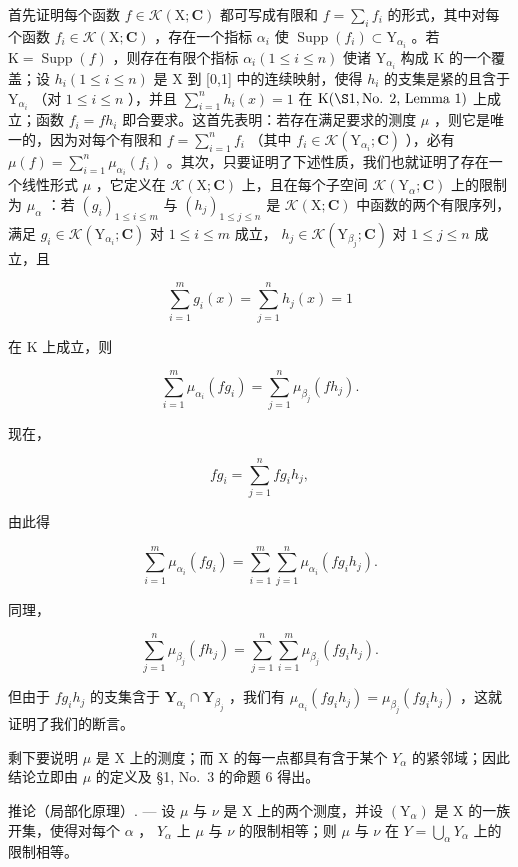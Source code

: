 首先证明每个函数 \(f \in \mathcal{K}(\mathrm{X};\mathbf{C})\) 都可写成有限和 \(f = \sum_{i} f_{i}\) 的形式，其中对每个函数 \(f_{i} \in \mathcal{K}(\mathrm{X};\mathbf{C})\) ，存在一个指标 \(\alpha_{i}\) 使 \(\operatorname{Supp}(f_{i}) \subset \mathrm{Y}_{\alpha_{i}}\) 。若 \(\mathrm{K} = \operatorname{Supp}(f)\) ，则存在有限个指标 \(\alpha_{i} (1 \leqslant i \leqslant n)\) 使诸 \(\mathrm{Y}_{\alpha_{i}}\) 构成 \(\mathrm{K}\) 的一个覆盖；设 \(h_{i} (1 \leqslant i \leqslant n)\) 是 \(\mathrm{X}\) 到 {[}0,1{]} 中的连续映射，使得 \(h_{i}\) 的支集是紧的且含于 \(\mathrm{Y}_{\alpha_{i}}\) （对 \(1 \leqslant i \leqslant n\) ），并且 \(\sum_{i=1}^{n} h_{i}(x) = 1\) 在 \(\mathrm{K} (\S 1, \text{No. 2, Lemma 1})\) 上成立；函数 \(f_{i} = f h_{i}\) 即合要求。这首先表明：若存在满足要求的测度 \(\mu\) ，则它是唯一的，因为对每个有限和 \(f = \sum_{i=1}^{n} f_{i}\) （其中 \(f_{i} \in \mathcal{K}(\mathrm{Y}_{\alpha_{i}}; \mathbf{C})\) ），必有 \(\mu(f) = \sum_{i=1}^{n} \mu_{\alpha_{i}}(f_{i})\) 。其次，只要证明了下述性质，我们也就证明了存在一个线性形式 \(\mu\) ，它定义在 \(\mathcal{K}(\mathrm{X};\mathbf{C})\) 上，且在每个子空间 \(\mathcal{K}(\mathrm{Y}_{\alpha};\mathbf{C})\) 上的限制为 \(\mu_{\alpha}\) ：若 \((g_{i})_{1 \leqslant i \leqslant m}\) 与 \((h_{j})_{1 \leqslant j \leqslant n}\) 是 \(\mathcal{K}(\mathrm{X};\mathbf{C})\) 中函数的两个有限序列，满足 \(g_{i} \in \mathcal{K}(\mathrm{Y}_{\alpha_{i}}; \mathbf{C})\) 对 \(1 \leqslant i \leqslant m\) 成立， \(h_{j} \in \mathcal{K}(\mathrm{Y}_{\beta_{j}}; \mathbf{C})\) 对 \(1 \leqslant j \leqslant n\) 成立，且

\[
\sum_ {i = 1} ^ {m} g _ {i} (x) = \sum_ {j = 1} ^ {n} h _ {j} (x) = 1
\]

在 K 上成立，则

\[
\sum_ {i = 1} ^ {m} \mu_ {\alpha_ {i}} (f g _ {i}) = \sum_ {j = 1} ^ {n} \mu_ {\beta_ {j}} (f h _ {j}).
\]

现在，

\[
f g _ {i} = \sum_ {j = 1} ^ {n} f g _ {i} h _ {j},
\]

由此得

\[
\sum_ {i = 1} ^ {m} \mu_ {\alpha_ {i}} (f g _ {i}) = \sum_ {i = 1} ^ {m} \sum_ {j = 1} ^ {n} \mu_ {\alpha_ {i}} (f g _ {i} h _ {j}).
\]

同理，

\[
\sum_ {j = 1} ^ {n} \mu_ {\beta_ {j}} (f h _ {j}) = \sum_ {j = 1} ^ {n} \sum_ {i = 1} ^ {m} \mu_ {\beta_ {j}} (f g _ {i} h _ {j}).
\]

但由于 \(fg_{i}h_{j}\) 的支集含于 \(\mathbf{Y}_{\alpha_i}\cap \mathbf{Y}_{\beta_j}\) ，我们有 \(\mu_{\alpha_i}(fg_i h_j) = \mu_{\beta_j}(fg_i h_j)\) ，这就证明了我们的断言。

剩下要说明 \(\mu\) 是 X 上的测度；而 X 的每一点都具有含于某个 \(Y_{\alpha}\) 的紧邻域；因此结论立即由 \(\mu\) 的定义及 §1, No.~3 的命题 6 得出。

推论（局部化原理）. --- 设 \(\mu\) 与 \(\nu\) 是 X 上的两个测度，并设 \((\mathrm{Y}_{\alpha})\) 是 X 的一族开集，使得对每个 \(\alpha\) ， \(Y_{\alpha}\) 上 \(\mu\) 与 \(\nu\) 的限制相等；则 \(\mu\) 与 \(\nu\) 在 \(Y = \bigcup_{\alpha} Y_{\alpha}\) 上的限制相等。

